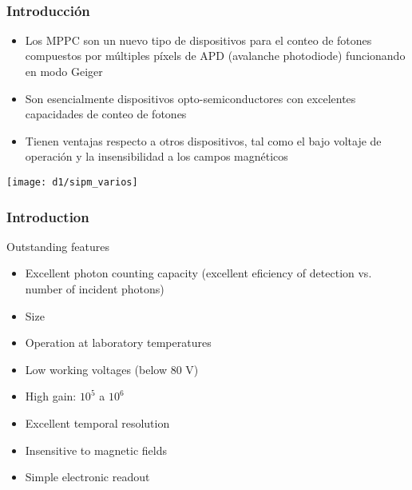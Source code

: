 \documentclass{beamer}
\begin{document}
\begin{frame}
\begin{center}
\Huge{\color{blue}{Los SiPM (o MPPC)}} \\
\begin{center}
\end{center}
\end{center}
\end{frame}

\begin{frame}
\frametitle{Introducci\'on}
\begin{block}{}
\begin{itemize}
\item Los MPPC son un nuevo tipo de dispositivos para el conteo de fotones
compuestos por m\'ultiples p\'ixels de APD (avalanche
photodiode) funcionando en modo Geiger
\item Son esencialmente dispositivos opto-semiconductores con excelentes
capacidades de conteo de fotones
\item Tienen ventajas respecto a otros dispositivos, tal como el bajo voltaje de
operaci\'on y la insensibilidad a los campos magn\'eticos 
\end{itemize}
\end{block}
\begin{center}
\texttt{[image: d1/sipm\_varios]}
\end{center}
\end{frame}

\begin{frame}
\frametitle{Introduction}
\begin{block}{Outstanding features}
\begin{itemize}
\item Excellent photon counting capacity (excellent eficiency of detection vs.
number of incident photons)
\item Size
\item Operation at laboratory temperatures
\item Low working voltages (below 80 V)
\item High gain: $10^5$ a $10^6$
\item Excellent temporal resolution
\item Insensitive to magnetic fields
\item Simple electronic readout
\end{itemize}
\end{block}
\end{frame}
\end{document}
